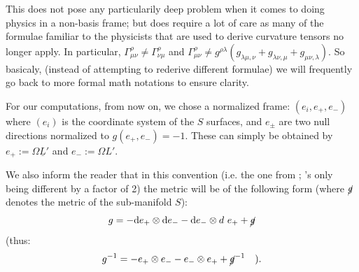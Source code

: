 \documentclass[a4paper,11pt]{article}
\numberwithin{equation}{section}
\theoremstyle{definition}
\renewcommand{\d}{{\mathrm{d}}}
\begin{document}
This does not pose any particularily deep problem when it comes to doing physics in a non-basis frame; but does require a lot of care as many of the formulae familiar to the physicists that are used to derive curvature tensors no longer apply. In particular, $\Gamma_{\mu\nu}^\rho\ne\Gamma_{\nu\mu}^\rho$ and $\Gamma_{\mu\nu}^\rho\ne g^{\rho\lambda}(g_{\lambda\mu,\nu}+g_{\lambda\nu,\mu}+g_{\mu\nu,\lambda})$. So basicaly, (instead of attempting to rederive different formulae) we will frequently go back to more formal math notations to ensure clarity.

For our computations, from now on, we chose a normalized frame: $(e_i,e_+,e_-)$ where $(e_i)$ is the coordinate system of the $S$ surfaces, and $e_\pm$ are two null directions normalized to $g(e_+,e_-)=-1$. These can simply be obtained by $e_+:=\Omega\underline{L}'$ and $e_-:=\Omega L'$.

We also inform the reader that in this convention (i.e. the one from \cite{Art}; \cite{Chris}'s only being different by a factor of 2) the metric will be of the following form (where $\cancel{g}$ denotes the metric of the sub-manifold $S$):
\begin{equation}
    g=-\d e_+\otimes \d e_- - \d e_-\otimes d\ e_+ + \cancel{g}
\end{equation}
(thus:
$$g^{-1}=-e_+\otimes e_- - e_-\otimes e_+ + \cancel{g}^{-1} \quad ).$$
\end{document}
